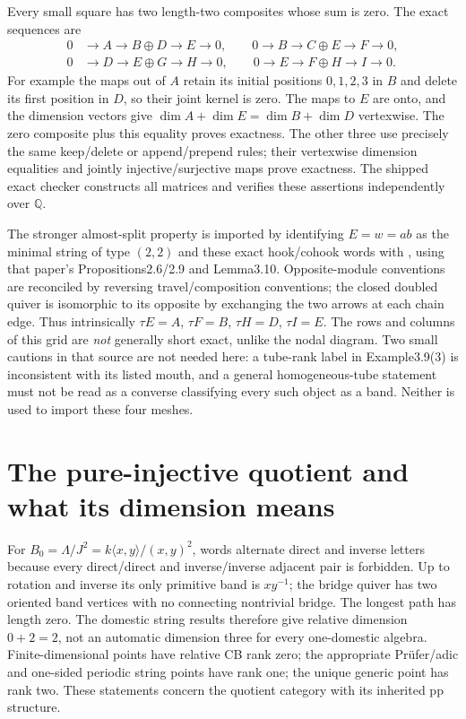 Every small square has two length-two composites whose sum is zero. The exact sequences are
\[
\begin{split}
0&\to A\to B\oplus D\to E\to0,\qquad
0\to B\to C\oplus E\to F\to0,\\
0&\to D\to E\oplus G\to H\to0,\qquad
0\to E\to F\oplus H\to I\to0.
\end{split}
\]
For example the maps out of $A$ retain its initial positions $0,1,2,3$ in $B$ and delete its first position in $D$, so their joint kernel is zero. The maps to $E$ are onto, and the dimension vectors give $\dim A+\dim E=\dim B+\dim D$ vertexwise. The zero composite plus this equality proves exactness. The other three use precisely the same keep/delete or append/prepend rules; their vertexwise dimension equalities and jointly injective/surjective maps prove exactness. The shipped exact checker constructs all matrices and verifies these assertions independently over $\mathbb Q$.

The stronger almost-split property is imported by identifying $E=w=ab$ as the minimal string of type $(2,2)$ and these exact hook/cohook words with \cite[Proposition3.12]{HuangLinSu}, using that paper's Propositions2.6/2.9 and Lemma3.10. Opposite-module conventions are reconciled by reversing travel/composition conventions; the closed doubled quiver is isomorphic to its opposite by exchanging the two arrows at each chain edge. Thus intrinsically $\tau E=A$, $\tau F=B$, $\tau H=D$, $\tau I=E$. The rows and columns of this grid are \emph{not} generally short exact, unlike the nodal diagram. Two small cautions in that source are not needed here: a tube-rank label in Example3.9(3) is inconsistent with its listed mouth, and a general homogeneous-tube statement must not be read as a converse classifying every such object as a band. Neither is used to import these four meshes.

\section{The pure-injective quotient and what its dimension means}
For $B_0=\Lambda/J^2=k\langle x,y\rangle/(x,y)^2$, words alternate direct and inverse letters because every direct/direct and inverse/inverse adjacent pair is forbidden. Up to rotation and inverse its only primitive band is $xy^{-1}$; the bridge quiver has two oriented band vertices with no connecting nontrivial bridge. The longest path has length zero. The domestic string results \cite{PuninskiPrest,LakingPrestPuninski} therefore give relative dimension $0+2=2$, not an automatic dimension three for every one-domestic algebra. Finite-dimensional points have relative CB rank zero; the appropriate Prüfer/adic and one-sided periodic string points have rank one; the unique generic point has rank two. These statements concern the quotient category with its inherited pp structure.

